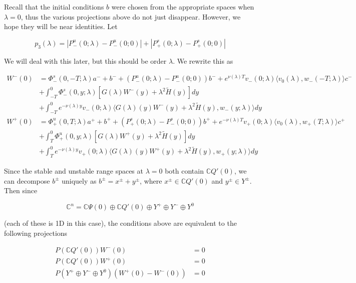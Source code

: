 \documentclass[12pt]{article}
\def\C{{\mathbb C}}
\begin{document}
\begin{enumerate}
Recall that the initial conditions $b$ were chosen from the appropriate spaces when $\lambda = 0$, thus the various projections above do not just disappear. However, we hope they will be near identities. Let

\[
p_3(\lambda) = |P^u_-(0;\lambda) - P^u_-(0; 0)| + |P^s_+(0;\lambda) - P^s_+(0;0)|
\]

We will deal with this later, but this should be order $\lambda$. We rewrite this as

\begin{align*}
W^-(0) &= \Phi^s_-(0, -T; \lambda )a^- + b^- + (P^u_-(0; \lambda) - P^u_-(0; 0))b^- + e^{\nu(\lambda)T} v_-(0; \lambda) \langle v_0(\lambda), w_-(-T; \lambda) \rangle c^- \\
&+ \int_{-T}^0 \Phi^s_-(0, y; \lambda) [ G(\lambda)W^-(y) + \lambda^2 \tilde{H}(y) ] dy \\
&+ \int_{-T}^0 
e^{-\nu(\lambda)y} v_-(0; \lambda) \langle G(\lambda)(y)W^-(y) + \lambda^2 \tilde{H}(y), w_-(y; \lambda) \rangle dy \\
W^+(0) &= \Phi^u_+(0, T; \lambda)a^+ + b^+ + (P^s_+(0; \lambda) - P^s_-(0; 0))b^+ + e^{-\nu(\lambda)T} v_+(0; \lambda) \langle v_0(\lambda), w_+(T; \lambda) \rangle c^+ \\
&+ \int_T^0 \Phi^u_+(0, y; \lambda) [ G(\lambda)W^+(y) + \lambda^2 \tilde{H}(y) ] dy \\
&+ \int_T^0 e^{-\nu(\lambda)y} v_+(0; \lambda) \langle G(\lambda)(y)W^+(y) + \lambda^2 \tilde{H}(y), w_+(y; \lambda) \rangle dy
\end{align*}

Since the stable and unstable range spaces at $\lambda = 0$ both contain $\C Q'(0)$, we can decompose $b^\pm$ uniquely as $b^\pm = x^\pm + y^\pm$, where $x^\pm \in \C Q'(0)$ and $y^\pm \in Y^\pm$. Then since

\begin{equation}\label{directsum}
\C^n = \C\Psi(0) \oplus \C Q'(0) \oplus Y^+ \oplus Y^- \oplus Y^0
\end{equation}

(each of these is 1D in this case), the conditions above are equivalent to the following projections

\begin{align*}
P(\C Q'(0))W^-(0) &= 0 \\
P(\C Q'(0))W^+(0) &= 0 \\
P(Y^+ \oplus Y^- \oplus Y^0) (W^+(0) - W^-(0) ) &= 0
\end{align*}


\end{enumerate}
\end{document}

